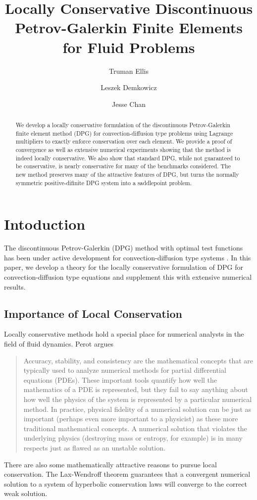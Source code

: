 \documentclass[letterpaper]{article}
\title{Locally Conservative Discontinuous Petrov-Galerkin Finite Elements for
Fluid Problems}
\author{Truman Ellis}
\author{Leszek Demkowicz}
\author{Jesse Chan}
\affil{Institute for Computational Engineering and Sciences,\\
The University of Texas at Austin, \\
Austin, TX 78712}
\date{}
\begin{document}
\maketitle

\begin{abstract}
We develop a locally conservative formulation of the discontinuous
Petrov-Galerkin finite element method (DPG) for convection-diffusion type
problems using Lagrange multipliers to exactly enforce conservation over each
element. We provide a proof of convergence as well as extensive numerical
experiments showing that the method is indeed locally conservative. We also
show that standard DPG, while not guaranteed to be conservative, is nearly
conservative for many of the benchmarks considered. The new method preserves many of
the attractive features of DPG, but turns the normally symmetric
positive-difinite DPG system into a saddlepoint problem.
\end{abstract}

\section{Intoduction}
The discontinuous Petrov-Galerkin (DPG) method with optimal test functions has
been under active development for convection-diffusion type systems
\cite{DPG1, DPG2, DPG3, DPG5, DemkowiczHeuer, ChanHeuerThanhDemkowicz2012,
MoroNguyenPeraire11}. In this paper, we develop a theory for the locally conservative
formulation of DPG for convection-diffusion type equations and supplement this
with extensive numerical results.

\subsection{Importance of Local Conservation}
Locally conservative methods hold a special place for numerical analysts in
the field of fluid dynamics.
Perot\cite{Perot2011} argues
\begin{quote}
Accuracy, stability, and consistency are the mathematical concepts that are
typically used to analyze numerical methods for partial differential equations
(PDEs). These important tools quantify how well the mathematics of a PDE is
represented, but they fail to say anything about how well the physics of the
system is represented by a particular numerical method. In practice, physical
fidelity of a numerical solution can be just as important (perhaps even more
important to a physicist) as these more traditional mathematical concepts. A
numerical solution that violates the underlying physics (destroying mass or
entropy, for example) is in many respects just as flawed as an unstable
solution.
\end{quote}
There are also some mathematically attractive reasons to pursue local
conservation. The Lax-Wendroff theorem guarantees that a convergent numerical
solution to a system of hyperbolic conservation laws will converge to the
correct weak solution.
\end{document}
